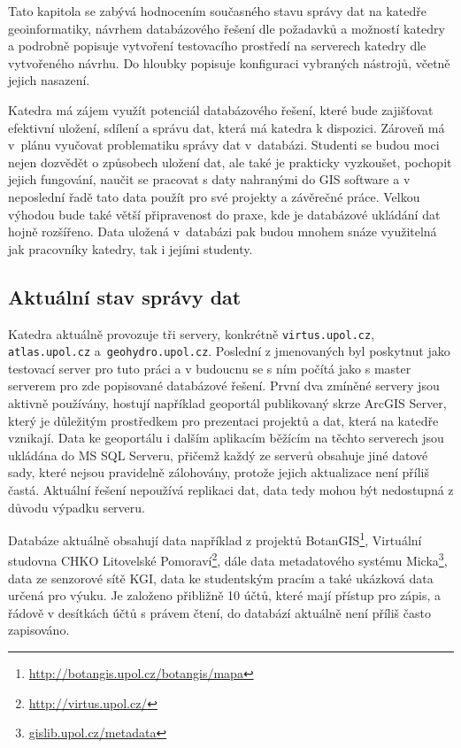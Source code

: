 Tato kapitola se zabývá hodnocením současného stavu správy dat na katedře geoinformatiky, návrhem databázového řešení dle požadavků a možností katedry a podrobně popisuje vytvoření testovacího prostředí na serverech katedry dle vytvořeného návrhu. Do hloubky popisuje konfiguraci vybraných nástrojů, včetně jejich nasazení.

Katedra má zájem využít potenciál databázového řešení, které bude zajišťovat efektivní uložení, sdílení a správu dat, která má katedra k dispozici. Zároveň má v~plánu vyučovat problematiku správy dat v~databázi. Studenti se budou moci nejen dozvědět o způsobech uložení dat, ale také je prakticky vyzkoušet, pochopit jejich fungování, naučit se pracovat s daty nahranými do GIS software a v neposlední řadě tato data použít pro své projekty a závěrečné práce. Velkou výhodou bude také větší připravenost do praxe, kde je databázové ukládání dat hojně rozšířeno. Data uložená v~databázi pak budou mnohem snáze využitelná jak pracovníky katedry, tak i jejími studenty. 

\subsection{Aktuální stav správy dat}
\label{kAktualniStav}

Katedra aktuálně provozuje tři servery, konkrétně \texttt{virtus.upol.cz}, \texttt{atlas.upol.cz} a~\texttt{geo\-hydro.upol.cz}. Poslední z jmenovaných byl poskytnut jako testovací server pro tuto práci a v budoucnu se s ním počítá jako s master serverem pro zde popisované databázové řešení. První dva zmíněné servery jsou aktivně používány, hostují například geoportál publikovaný skrze ArcGIS Server, který je důležitým prostředkem pro prezentaci projektů a dat, která na katedře vznikají. Data ke geoportálu i dalším aplikacím běžícím na těchto serverech jsou ukládána do MS SQL Serveru, přičemž každý ze serverů obsahuje jiné datové sady, které nejsou pravidelně zálohovány, protože jejich aktualizace není příliš častá. Aktuální řešení nepoužívá replikaci dat, data tedy mohou být nedostupná z důvodu výpadku serveru. 

Databáze aktuálně obsahují data například z projektů BotanGIS\footnote{\url{http://botangis.upol.cz/botangis/mapa}}, Virtuální studovna CHKO Litovelské Pomoraví\footnote{\url{http://virtus.upol.cz/}}, dále data metadatového systému Micka\footnote{\url{gislib.upol.cz/metadata}}, data ze senzorové sítě KGI, data ke studentským pracím a také ukázková data určená pro výuku. Je založeno přibližně 10 účtů, které mají přístup pro zápis, a řádově v desítkách účtů s právem čtení, do databází aktuálně není příliš často zapisováno. 

